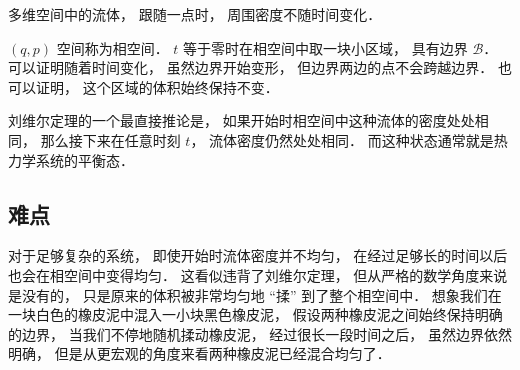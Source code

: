 
多维空间中的流体， 跟随一点时， 周围密度不随时间变化．

$(q, p)$ 空间称为相空间． $t$ 等于零时在相空间中取一块小区域， 具有边界 $\mathcal B$． 可以证明随着时间变化， 虽然边界开始变形， 但边界两边的点不会跨越边界． 也可以证明， 这个区域的体积始终保持不变．

刘维尔定理的一个最直接推论是， 如果开始时相空间中这种流体的密度处处相同， 那么接下来在任意时刻 $t$， 流体密度仍然处处相同． 而这种状态通常就是热力学系统的平衡态．

\subsection{难点}
对于足够复杂的系统， 即使开始时流体密度并不均匀， 在经过足够长的时间以后也会在相空间中变得均匀． 这看似违背了刘维尔定理， 但从严格的数学角度来说是没有的， 只是原来的体积被非常均匀地 “揉” 到了整个相空间中． 想象我们在一块白色的橡皮泥中混入一小块黑色橡皮泥， 假设两种橡皮泥之间始终保持明确的边界， 当我们不停地随机揉动橡皮泥， 经过很长一段时间之后， 虽然边界依然明确， 但是从更宏观的角度来看两种橡皮泥已经混合均匀了．
